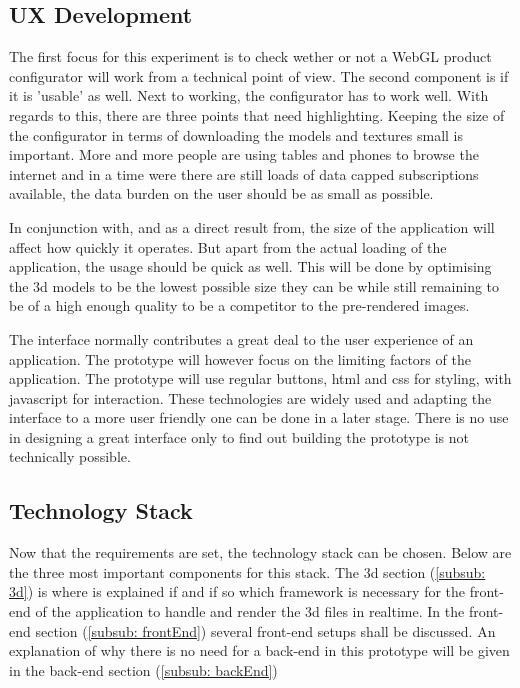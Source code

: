 \subsection{UX Development}
The first focus for this experiment is to check wether or not a WebGL product configurator will work from a technical point of view. The second component is if it is 'usable' as well. Next to working, the configurator has to work well. With regards to this, there are three points that need highlighting.
Keeping the size of the configurator in terms of downloading the models and textures small is important. More and more people are using tables and phones to browse the internet and in a time were there are still loads of data capped subscriptions available, the data burden on the user should be as small as possible.

In conjunction with, and as a direct result from, the size of the application will affect how quickly it operates. But apart from the actual loading of the application, the usage should be quick as well. This will be done by optimising the 3d models to be the lowest possible size they can be while still remaining to be of a high enough quality to be a competitor to the pre-rendered images.

The interface normally contributes a great deal to the user experience of an application. The prototype will however focus on the limiting factors of the application. The prototype will use regular buttons, html and css for styling, with javascript for interaction. These technologies are widely used and adapting the interface to a more user friendly one can be done in a later stage. There is no use in designing a great interface only to find out building the prototype is not technically possible.

\subsection{Technology Stack}
Now that the requirements are set, the technology stack can be chosen. Below are the three most important components for this stack. The 3d section (\ref{subsub: 3d}) is where is explained if and if so which framework is necessary for the front-end of the application to handle and render the 3d files in realtime. In the front-end section (\ref{subsub: frontEnd}) several front-end setups shall be discussed. An explanation of why there is no need for a back-end in this prototype will be given in the back-end section (\ref{subsub: backEnd})

